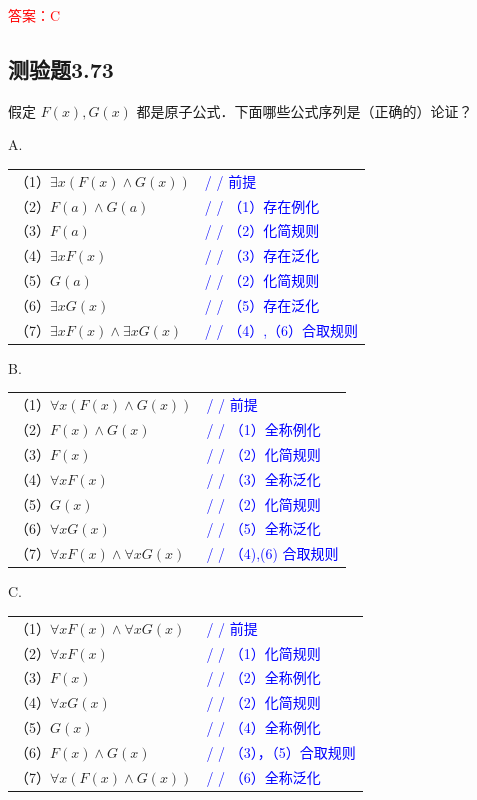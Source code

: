 \documentclass[UTF8, heading=true]{ctexart}
\begin{document}
\textcolor{red}{答案：C}

\subsection{测验题3.73}

假定 $F(x), G(x)$ 都是原子公式．下面哪些公式序列是（正确的）论证？

A. 

\begin{tabular}{ll}
  （1）$\exists x(F(x) \wedge G(x))$ & \textcolor{blue}{/ / 前提} \\
  （2）$F(a) \wedge G(a)$ & \textcolor{blue}{/ / （1）存在例化} \\
  （3）$F(a)$ & \textcolor{blue}{/ / （2）化简规则} \\
  （4）$\exists x F(x)$ & \textcolor{blue}{/ / （3）存在泛化} \\
  （5）$G(a)$ & \textcolor{blue}{/ / （2）化简规则} \\
  （6）$\exists x G(x)$ & \textcolor{blue}{/ / （5）存在泛化} \\
  （7）$\exists x F(x) \wedge \exists x G(x)$ & \textcolor{blue}{/ / （4）,（6）合取规则}
\end{tabular}

B. 

\begin{tabular}{ll}
  （1）$\forall x(F(x) \wedge G(x))$ & \textcolor{blue}{/ / 前提} \\
  （2）$F(x) \wedge G(x)$ & \textcolor{blue}{/ / （1）全称例化} \\
  （3）$F(x)$ & \textcolor{blue}{/ / （2）化简规则} \\
  （4）$\forall x F(x)$ & \textcolor{blue}{/ / （3）全称泛化} \\
  （5）$G(x)$ & \textcolor{blue}{/ / （2）化简规则} \\
  （6）$\forall x G(x)$ & \textcolor{blue}{/ / （5）全称泛化} \\
  （7）$\forall x F(x) \wedge \forall x G(x)$ & \textcolor{blue}{/ / （4),(6) 合取规则}
  \end{tabular}

C. 

\begin{tabular}{ll}
  （1）$\forall x F(x) \wedge \forall x G(x)$ & \textcolor{blue}{/ / 前提} \\
  （2）$\forall x F(x)$ & \textcolor{blue}{/ / （1）化简规则} \\
  （3）$F(x)$ & \textcolor{blue}{/ / （2）全称例化} \\
  （4）$\forall x G(x)$ & \textcolor{blue}{/ / （2）化简规则} \\
  （5）$G(x)$ & \textcolor{blue}{/ / （4）全称例化} \\
  （6）$F(x) \wedge G(x)$ & \textcolor{blue}{/ / （3），（5）合取规则} \\
  （7）$\forall x(F(x) \wedge G(x))$ & \textcolor{blue}{/ / （6）全称泛化}
\end{tabular}
\end{document}
